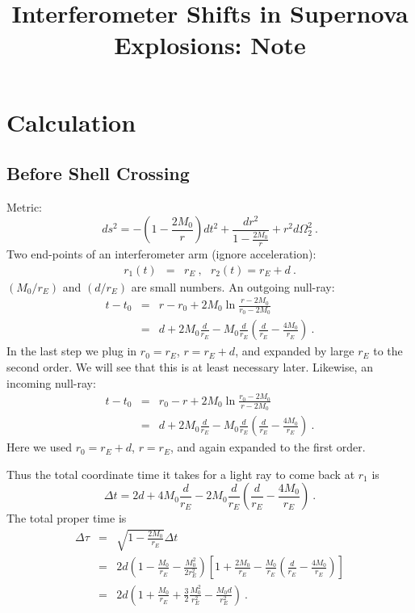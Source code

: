 \documentclass[12pt,letterpaper]{JHEP3}
\title{Interferometer Shifts in Supernova Explosions: Note}
\author{
}
\begin{document}
\section{Calculation}

\subsection{Before Shell Crossing}

Metric:
\begin{equation}
ds^2 = -\left(1-\frac{2M_{0}}{r}\right)dt^2 + \frac{dr^2}{1-\frac{2M_{0}}{r}}+r^2d\Omega_2^2~.
\end{equation}
Two end-points of an interferometer arm (ignore acceleration):
\begin{eqnarray}
r_1(t) &=& r_{E}~, \ \ \ r_2(t) = r_{E}+d~.
\end{eqnarray}
$(M_{0}/r_E)$ and $(d/r_E)$ are small numbers. An outgoing null-ray:
\begin{eqnarray}
t-t_0 &=& r-r_0 + 2M_{0}\ln\frac{r-2M_{0}}{r_0-2M_{0}} \\ \nonumber
&=& d + 2M_{0}\frac{d}{r_E} -M_{0}\frac{d}{r_E}
\left( \frac{d}{r_E}-\frac{4M_{0}}{r_E} \right)~.
\label{eq-dt1}
\end{eqnarray}
In the last step we plug in $r_0=r_E$, $r = r_E+d$, and expanded by large $r_E$ to the second order. We will see that this is at least necessary later. Likewise, an incoming null-ray:
\begin{eqnarray}
t-t_0 &=& r_0-r + 2M_{0}\ln\frac{r_0-2M_{0}}{r-2M_{0}} \\ \nonumber
&=& d + 2M_{0}\frac{d}{r_E} - M_{0}\frac{d}{r_E}
\left( \frac{d}{r_E}-\frac{4M_{0}}{r_E} \right) ~.
\end{eqnarray}
Here we used $r_0 = r_E+d$, $r = r_E$, and again expanded to the first order.

Thus the total coordinate time it takes for a light ray to come back at $r_1$ is
\begin{equation}
\Delta t = 2d + 4M_{0}\frac{d}{r_E} - 2M_{0}\frac{d}{r_E}
\left( \frac{d}{r_E}-\frac{4M_{0}}{r_E} \right)~.
\end{equation}
The total proper time is
\begin{eqnarray}
\Delta \tau &=& \sqrt{1-\frac{2M_{0}}{r_E}}\Delta t  \\ \nonumber
&=& 2d \left(1-\frac{M_{0}}{r_E} - \frac{M_{0}^2}{2r_E^2}\right) 
\left[ 1+\frac{2M_{0}}{r_E} - \frac{M_{0}}{r_E}\left( \frac{d}{r_E} - \frac{4M_{0}}{r_E} \right) \right] \\ \nonumber
&=& 2d
\left(1 + \frac{M_{0}}{r_E} + \frac{3}{2}\frac{M_{0}^2}{r_E^2} - \frac{M_{0}d}{r_E^2}\right)~.
\end{eqnarray}
\end{document}
